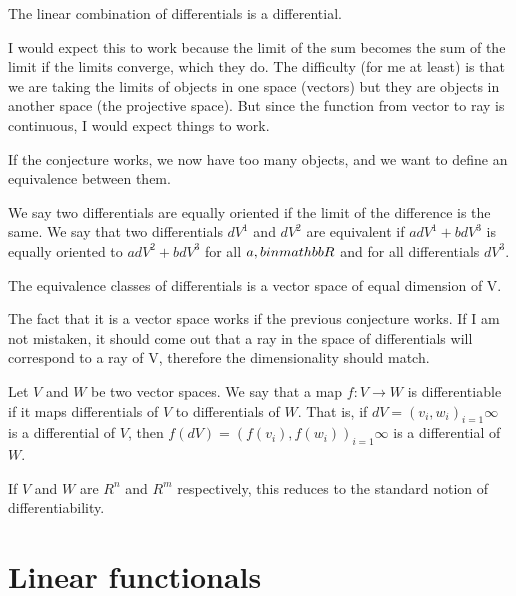 \begin{conj}
	The linear combination of differentials is a differential.
\end{conj}
\begin{remark}
	I would expect this to work because the limit of the sum becomes the sum of the limit if the limits converge, which they do. The difficulty (for me at least) is that we are taking the limits of objects in one space (vectors) but they are objects in another space (the projective space). But since the function from vector to ray is continuous, I would expect things to work.
\end{remark}

If the conjecture works, we now have too many objects, and we want to define an equivalence between them.

\begin{defn}
	We say two differentials are equally oriented if the limit of the difference is the same. We say that two differentials $dV^1$ and $dV^2$ are equivalent if $a dV^1 + b dV^3$ is equally oriented to $a dV^2 + bdV^3$ for all $a, b in \\mathbb{R}$ and for all differentials $dV^3$.
\end{defn}
\begin{conj}
	The equivalence classes of differentials is a vector space of equal dimension of V.
\end{conj}
\begin{remark}
	The fact that it is a vector space works if the previous conjecture works. If I am not mistaken, it should come out that a ray in the space of differentials will correspond to a ray of V, therefore the dimensionality should match.
\end{remark}

\begin{defn}
	Let $V$ and $W$ be two vector spaces. We say that a map $f: V \to W$ is differentiable if it maps differentials of $V$ to differentials of $W$. That is, if $dV=(v_i, w_i)_{i=1}{\infty}$ is a differential of $V$, then $f(dV)= (f(v_i), f(w_i))_{i=1}{\infty}$ is a differential of $W$.
\end{defn}
\begin{conj}
	If $V$ and $W$ are $R^n$ and $R^m$ respectively, this reduces to the standard notion of differentiability.
\end{conj}

\section{Linear functionals}

